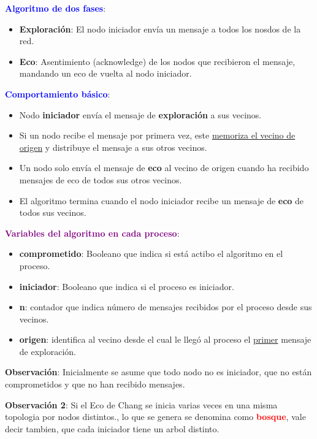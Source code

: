 \textbf{\textcolor{blue}{Algoritmo de dos fases}}: \begin{itemize}
    \item \textbf{Exploración}: El nodo iniciador envía un mensaje a todos los nosdos de la red.
    \item \textbf{Eco}: Asentimiento (acknowledge) de los nodos que recibieron el mensaje, mandando un eco de vuelta al nodo iniciador.
\end{itemize}

\textbf{\textcolor{blue}{Comportamiento básico}}: \begin{itemize}
    \item Nodo \textbf{iniciador} envía el mensaje de \textbf{exploración} a sus vecinos.
    \item Si un nodo recibe el mensaje por primera vez, este \underline{memoriza el vecino de origen} y distribuye el mensaje a sus otros vecinos.
    \item Un nodo solo envía el mensaje de \textbf{eco} al vecino de origen cuando ha recibido mensajes de eco de todos sus otros vecinos.
    \item El algoritmo termina cuando el nodo iniciador recibe un mensaje de \textbf{eco} de todos sus vecinos.
\end{itemize}

\textbf{{\textcolor{purple}{Variables del algoritmo en cada proceso}}}: \begin{itemize}
    \item \textbf{comprometido}: Booleano que indica si está actibo el algoritmo en el proceso.
    \item \textbf{iniciador}: Booleano que indica si el proceso es iniciador.
    \item \textbf{n}: contador que indica número de mensajes recibidos por el proceso desde sus vecinos.
    \item \textbf{origen}: identifica al vecino desde el cual le llegó al proceso el \underline{primer} mensaje de exploración.
\end{itemize}

\textbf{Observación}: Inicialmente se asume que todo nodo no es iniciador, que no están comprometidos y que no han recibido mensajes.

\textbf{Observación 2}: Si el Eco de Chang se inicia varias veces en una misma topologia por nodos distintos., lo que se genera se denomina como \textcolor{red}{\textbf{bosque}}, vale decir tambien, que cada iniciador tiene un arbol distinto.
\vspace{0.5em}

